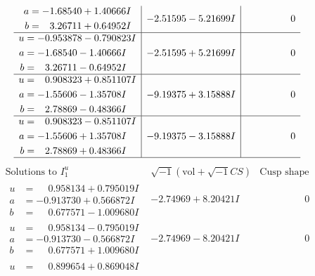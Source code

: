 \documentclass[1p]{elsarticle_modified}
\theoremstyle{definition}
\newcommand{\I}{\sqrt{-1}}
\begin{document}
$$\begin{array}{c|c|c}
\begin{aligned}
a &= -1.68540 + 1.40666 I \\
b &= \phantom{-}3.26711 + 0.64952 I\end{aligned}
 & -2.51595 - 5.21699 I & \phantom{-0.000000 } 0 \\ \hline\begin{aligned}
u &= -0.953878 - 0.790823 I \\
a &= -1.68540 - 1.40666 I \\
b &= \phantom{-}3.26711 - 0.64952 I\end{aligned}
 & -2.51595 + 5.21699 I & \phantom{-0.000000 } 0 \\ \hline\begin{aligned}
u &= \phantom{-}0.908323 + 0.851107 I \\
a &= -1.55606 - 1.35708 I \\
b &= \phantom{-}2.78869 - 0.48366 I\end{aligned}
 & -9.19375 + 3.15888 I & \phantom{-0.000000 } 0 \\ \hline\begin{aligned}
u &= \phantom{-}0.908323 - 0.851107 I \\
a &= -1.55606 + 1.35708 I \\
b &= \phantom{-}2.78869 + 0.48366 I\end{aligned}
 & -9.19375 - 3.15888 I & \phantom{-0.000000 } 0\\
 \hline 
 \end{array}$$\newpage$$\begin{array}{c|c|c}  
\text{Solutions to }I^u_{1}& \I (\text{vol} + \sqrt{-1}CS) & \text{Cusp shape}\\
 \hline 
\begin{aligned}
u &= \phantom{-}0.958134 + 0.795019 I \\
a &= -0.913730 + 0.566872 I \\
b &= \phantom{-}0.677571 - 1.009680 I\end{aligned}
 & -2.74969 + 8.20421 I & \phantom{-0.000000 } 0 \\ \hline\begin{aligned}
u &= \phantom{-}0.958134 - 0.795019 I \\
a &= -0.913730 - 0.566872 I \\
b &= \phantom{-}0.677571 + 1.009680 I\end{aligned}
 & -2.74969 - 8.20421 I & \phantom{-0.000000 } 0 \\ \hline\begin{aligned}
u &= \phantom{-}0.899654 + 0.869048 I \\

\end{aligned}
\end{array}$$
\end{document}
